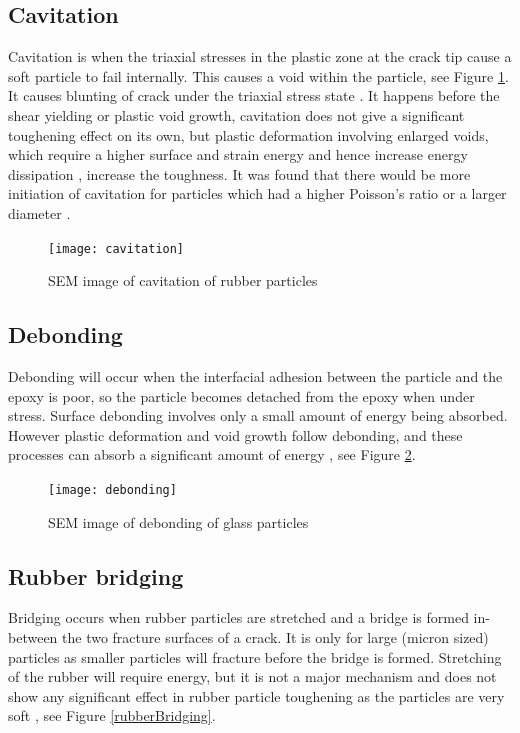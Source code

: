 \documentclass[numbers=noendperiod,chapterprefix=on]{icldt} %
\begin{document}
\subsection{Cavitation} 
Cavitation is when the triaxial stresses in the plastic zone at the crack tip cause a soft particle to fail internally. This causes a void within the particle, see Figure \ref{cavitation}. It causes blunting of crack under the triaxial stress state \cite{Babu2012}. It happens before the shear yielding or plastic void growth, cavitation does not give a significant toughening effect on its own, but plastic deformation involving enlarged voids, which require a higher surface and strain energy and hence increase energy dissipation \cite{Kinloch1985}, increase the toughness. It was found that there would be more initiation of cavitation for particles which had a higher Poisson's ratio \cite{Moloney1987} or a larger diameter \cite{Bucknall2007}.

\begin{figure}[!htpb]
\centering
\texttt{[image: cavitation]}
\caption{SEM image of cavitation of rubber particles \cite{Kinloch1997} } \label{cavitation}
\end{figure}
\FloatBarrier

\subsection{Debonding}
Debonding will occur when the interfacial adhesion between the particle and the epoxy is poor, so the particle becomes detached from the epoxy when under stress. Surface debonding involves only a small amount of energy being absorbed. However plastic deformation and void growth follow debonding, and these processes can absorb a significant amount of energy \cite{Mohammed2007}, see Figure \ref{debonding}. 

\begin{figure}[!hp]
\centering
\texttt{[image: debonding]}
\caption{SEM image of debonding of glass particles \cite{Huang1992d}} \label{debonding}
\end{figure}
\FloatBarrier

\subsection{Rubber bridging}
Bridging occurs when rubber particles are stretched and a bridge is formed in-between the two fracture surfaces of a crack. It is only for large (micron sized) particles as smaller particles will fracture before the bridge is formed. Stretching of the rubber will require energy, but it is not a major mechanism and does not show any significant effect in rubber particle toughening as the particles are very soft \cite{Mohammed2007}, see Figure \ref{rubberBridging}. 
\end{document}
